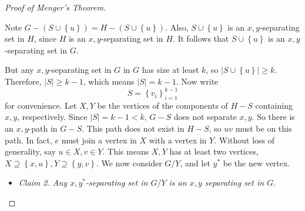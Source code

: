 \documentclass[co342]{subfiles}
\begin{document}
\begin{proof}[Proof of Menger's Theorem]
\begin{itemize}
\begin{itemize}
                        \begin{subproof}
                            Note $G-\left( S\cup \left\lbrace u \right\rbrace \right)=H-\left( S\cup \left\lbrace u \right\rbrace \right)$. Also, $S\cup \left\lbrace u \right\rbrace$ is an $x,y$-separating set in $H$, since $H$ is an $x,y$-separating set in $H$. It follows that $S\cup\left\lbrace u \right\rbrace$ is an $x,y$-separating set in $G$. 
                        \end{subproof}
                \end{itemize} 
                But any $x,y$-separating set in $G$ in $G$ has size at least $k$, so $\left| S\cup\left\lbrace u \right\rbrace \right|\geq k$. Therefore, $\left| S \right|\geq k-1$, which means $\left| S \right|= k-1$. 
                Now write
                \begin{equation*}
                    S = \left\lbrace v_i \right\rbrace^{k-1}_{i=1}
                \end{equation*}
                for convenience. Let $X,Y$ be the vertices of the components of $H-S$ containing $x,y$, respectively. Since $\left| S \right|= k-1<k$, $G-S$ does not separate $x,y$. So there is an $x,y$-path in $G-S$. This path does not exist in $H-S$, so $uv$ must be on this path. In fact, $e$ must join a vertex in $X$ with a vertex in $Y$. Without loss of generality, say $u\in X, v\in Y$. This means $X,Y$ has at least two vertices, $X\supseteq \left\lbrace x,u \right\rbrace, Y\supseteq\left\lbrace y,v \right\rbrace$. We now consider $G /Y$, and let $y^{*}$ be the new vertex.
                \begin{itemize}
                    \item \textit{Claim 2. Any $x,y^{*}$-separating set in $G /Y$ is an $x,y$ separating set in $G$.}


\end{itemize}
\end{itemize}
\end{proof}
\end{document}
